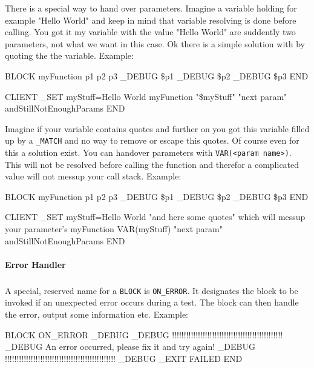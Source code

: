 There is a special way to hand over parameters. Imagine a variable holding for
example "Hello World" and keep in mind that variable resolving is done before 
calling. You got it my variable with the value "Hello World" are suddently two
parameters, not what we want in this case. Ok there is a simple solution with by
quoting the the variable. 
Example:
\begin{usplisting}
    BLOCK myFunction p1 p2 p3
      _DEBUG \$p1
      _DEBUG \$p2
      _DEBUG \$p3
    END 

    CLIENT
      _SET myStuff=Hello World
      myFunction "\$myStuff" "next param" andStillNotEnoughParams
    END
\end{usplisting}

Imagine if your variable contains quotes and further on you got this variable 
filled up by a \texttt{_MATCH} and no way to remove or escape this quotes.
Of course even for this a solution exist. You can handover parameters with
\texttt{VAR(<param name>)}. This will not be resolved before calling the function
and therefor a complicated value will not messup your call stack.
Example:
\begin{usplisting}
    BLOCK myFunction p1 p2 p3
      _DEBUG \$p1
      _DEBUG \$p2
      _DEBUG \$p3
    END 

    CLIENT
      _SET myStuff=Hello World "and here some quotes" which will messup your parameter's
      myFunction VAR(myStuff) "next param" andStillNotEnoughParams
    END
\end{usplisting}


\paragraph{Error Handler}
\subparagraph{}
A special, reserved name for a \texttt{BLOCK} is \texttt{ON\_ERROR}. It 
designates the block to be invoked if an unexpected error occurs during 
a test. The block can then handle the error, output some information etc. 
Example:

\begin{usplisting}
    BLOCK ON_ERROR
    _DEBUG
    _DEBUG !!!!!!!!!!!!!!!!!!!!!!!!!!!!!!!!!!!!!!!!!!!!!!!
    _DEBUG An error occurred, please fix it and try again!
    _DEBUG !!!!!!!!!!!!!!!!!!!!!!!!!!!!!!!!!!!!!!!!!!!!!!!
    _DEBUG
    _EXIT FAILED
    END
\end{usplisting}
